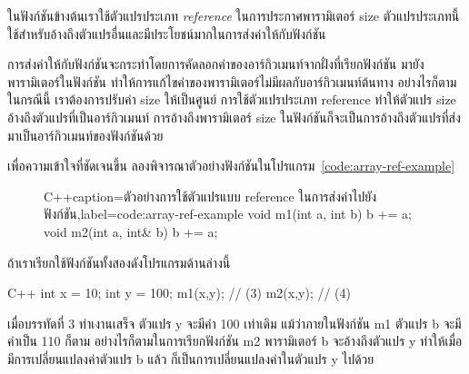 ใน{\wbr}ฟังก์ชัน{\wbr}ข้าง{\wbr}ต้น{\wbr}เรา{\wbr}ใช้{\wbr}ตัวแปร{\wbr}ประเภท {\em reference} ใน{\wbr}การ{\wbr}ประกาศ{\wbr}พารามิเตอร์ {\ct
size} ตัวแปร{\wbr}ประเภท{\wbr}นี้{\wbr}ใช้{\wbr}สำหรับ{\wbr}อ้าง{\wbr}ถึง{\wbr}ตัวแปร{\wbr}อื่น{\wbr}และ{\wbr}มี{\wbr}ประโยชน์{\wbr}มาก{\wbr}ใน{\wbr}การ{\wbr}ส่ง{\wbr}ค่า{\wbr}ให้{\wbr}กับ{\wbr}ฟังก์ชัน{\wbr}

การ{\wbr}ส่ง{\wbr}ค่า{\wbr}ให้{\wbr}กับ{\wbr}ฟังก์ชัน{\wbr}จะ{\wbr}กระทำ{\wbr}โดย{\wbr}การ{\wbr}คัด{\wbr}ลอก{\wbr}ค่า{\wbr}ของ{\wbr}อาร์{\wbr}กิวเมนท์{\wbr}จาก{\wbr}ฝั่ง{\wbr}ที่{\wbr}เรียก{\wbr}ฟังก์ชัน{\wbr}
มา{\wbr}ยัง{\wbr}พารามิเตอร์{\wbr}ใน{\wbr}ฟังก์ชัน ทำให้{\wbr}การ{\wbr}แก้ไข{\wbr}ค่า{\wbr}ของ{\wbr}พารามิเตอร์{\wbr}ไม่{\wbr}มี{\wbr}ผล{\wbr}กับ{\wbr}อาร์{\wbr}กิวเมนท์{\wbr}ต้น{\wbr}ทาง{\wbr}
อย่างไร{\wbr}ก็{\wbr}ตาม{\wbr}ใน{\wbr}กรณี{\wbr}นี้ เรา{\wbr}ต้องการ{\wbr}ปรับ{\wbr}ค่า {\ct size} ให้{\wbr}เป็น{\wbr}ศูนย์ การ{\wbr}ใช้{\wbr}ตัวแปร{\wbr}ประเภท{\wbr}
reference ทำให้{\wbr}ตัวแปร {\ct size} อ้าง{\wbr}ถึง{\wbr}ตัวแปร{\wbr}ที่{\wbr}เป็น{\wbr}อาร์{\wbr}กิวเมนท์
การ{\wbr}อ้าง{\wbr}ถึง{\wbr}พารามิเตอร์ {\ct size}
ใน{\wbr}ฟังก์ชัน{\wbr}ก็{\wbr}จะ{\wbr}เป็น{\wbr}การ{\wbr}อ้าง{\wbr}ถึง{\wbr}ตัวแปร{\wbr}ที่{\wbr}ส่ง{\wbr}มา{\wbr}เป็น{\wbr}อาร์{\wbr}กิวเมนท์{\wbr}ของ{\wbr}ฟังก์ชัน{\wbr}ด้วย{\wbr}

เพื่อ{\wbr}ความ{\wbr}เข้าใจ{\wbr}ที่{\wbr}ชัดเจน{\wbr}ขึ้น{\wbr}
ลอง{\wbr}พิจารณา{\wbr}ตัวอย่าง{\wbr}ฟังก์ชัน{\wbr}ใน{\wbr}โปรแกรม~\ref{code:array-ref-example}

\begin{figure}
\latintext
\begin{codelist}{C++}{caption={\thaitext ตัวอย่าง{\wbr}การ{\wbr}ใช้{\wbr}ตัวแปร{\wbr}แบบ reference ใน{\wbr}การ{\wbr}ส่ง{\wbr}ค่า{\wbr}ไป{\wbr}ยัง{\wbr}ฟังก์ชัน\latintext},label=code:array-ref-example}
void m1(int a, int b)
{
  b += a;
}
void m2(int a, int& b)
{
  b += a;
}
\end{codelist}
\thaitext
\end{figure}

ถ้า{\wbr}เรา{\wbr}เรียก{\wbr}ใช้{\wbr}ฟังก์ชัน{\wbr}ทั้ง{\wbr}สอง{\wbr}ดัง{\wbr}โปรแกรม{\wbr}ด้าน{\wbr}ล่าง{\wbr}นี้{\wbr}

\latintext
\begin{codelist}{C++}{}
int x = 10;
int y = 100;
m1(x,y);            // (3)
m2(x,y);            // (4)
\end{codelist}
\thaitext

เมื่อ{\wbr}บรรทัด{\wbr}ที่ 3 ทำ{\wbr}เงา{\wbr}น{\wbr}เสร็จ ตัวแปร {\ct y} จะ{\wbr}มี{\wbr}ค่า 100 เท่า{\wbr}เดิม แม้{\wbr}ว่า{\wbr}ภายใน{\wbr}ฟังก์ชัน{\wbr}
{\ct m1} ตัวแปร b จะ{\wbr}มี{\wbr}ค่า{\wbr}เป็น 110 ก็{\wbr}ตาม อย่างไร{\wbr}ก็{\wbr}ตาม{\wbr}ใน{\wbr}การ{\wbr}เรียก{\wbr}ฟังก์ชัน {\ct m2}
พารามิเตอร์ {\ct b} จะ{\wbr}อ้าง{\wbr}ถึง{\wbr}ตัวแปร {\ct y} ทำให้{\wbr}เมื่อ{\wbr}มี{\wbr}การ{\wbr}เปลี่ยนแปลง{\wbr}ค่า{\wbr}ตัวแปร{\wbr}
{\ct b} แล้ว ก็{\wbr}เป็น{\wbr}การ{\wbr}เปลี่ยนแปลง{\wbr}ค่า{\wbr}ใน{\wbr}ตัวแปร {\ct y} ไป{\wbr}ด้วย{\wbr}

